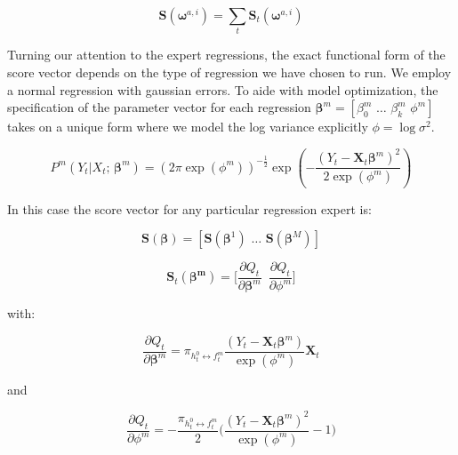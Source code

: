 \documentclass[12pt]{article}
\newcommand{\gateprod}[2]{\pi_{#1 \longleftrightarrow #2}}
\begin{document}
\begin{equation}
  \boldsymbol{S}(\boldsymbol{\omega}^{a, i}) = \sum_{t} \boldsymbol{S}_{t}(\boldsymbol{\omega}^{a, i})
\end{equation}


Turning our attention to the expert regressions, the exact functional form
of the score vector depends on the type of regression we have chosen to run.
We employ a normal regression with gaussian errors. To aide with model optimization,
the specification of the parameter vector for each regression
 $\boldsymbol{\beta}^{m} = [\beta_{0}^{m} \,\, \ldots \,\, \beta_{k}^m \,\, \phi^{m}]$
takes on a unique form where we model the log variance explicitly
$\phi = \log \sigma^{2}$.

\begin{equation}
  P^{m}(Y_{t} | X_{t}; \, \boldsymbol{\beta}^{m}) = \left( 2 \pi \exp ( \phi^{m} ) \right)^{-\frac{1}{2}} \exp{ \left( -\frac{  ( Y_{t} - \boldsymbol{X}_{t} \boldsymbol{\beta}^{m} )^{2}  }{2 \exp (\phi^{m}) } \right) }
\end{equation}


In this case the score vector for any particular
regression expert is:

\begin{equation}
  \boldsymbol{S}(\boldsymbol{\beta}) = [ \boldsymbol{S}(\boldsymbol{\beta}^{1}) \,\, \ldots \,\, \boldsymbol{S}(\boldsymbol{\beta}^{M}) ]
\end{equation}

\begin{equation} \label{eq:expertScore}
  \boldsymbol{S}_{t}(\boldsymbol{\beta^{m}}) = \Big[ \frac{\partial Q_{t}}{\partial \boldsymbol{\beta}^{m}} \,\,\, \frac{\partial Q_{t}}{\partial \phi^{m}} \Big]
\end{equation}

with:

\begin{equation}
  \frac{\partial Q_{t}}{\partial \boldsymbol{\beta}^{m}} = \gateprod{h^{0}_{t}}{f^{m}_{t}} \frac{( Y_{t} - \boldsymbol{X}_{t} \boldsymbol{\beta}^{m} )}{\exp{(\phi^{m})}} \boldsymbol{X}_{t}
\end{equation}
 
and

\begin{equation}
  \frac{\partial Q_{t}}{\partial \phi^{m}} = -\frac{\gateprod{h^{0}_{t}}{f^{m}_{t}}}{2} \Big( \frac{( Y_{t} - \boldsymbol{X}_{t} \boldsymbol{\beta}^{m} )^{2}}{\exp{(\phi^{m})}} - 1 \Big)
\end{equation}
\end{document}
